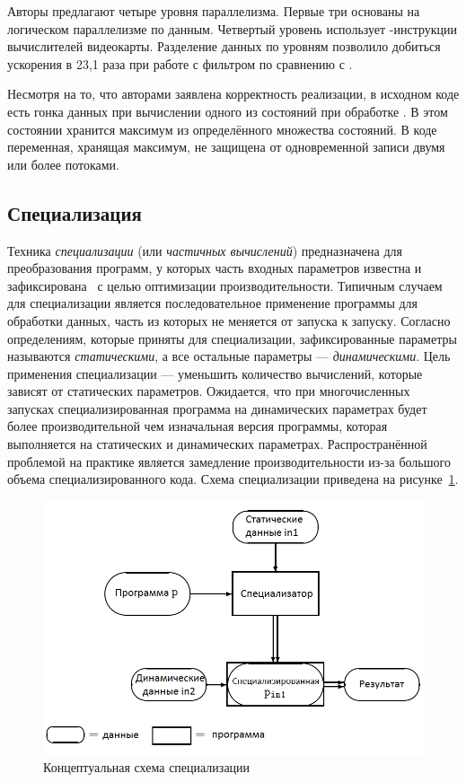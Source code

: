 Авторы предлагают четыре уровня параллелизма.
Первые три основаны на логическом параллелизме по данным.
Четвертый уровень использует -инструкции 
вычислителей видеокарты.
Разделение данных по уровням позволило добиться ускорения в 
23,1 раза при работе с фильтром  по сравнению с
.

Несмотря на то, что авторами заявлена корректность 
реализации, в исходном коде есть гонка данных при вычислении 
одного из состояний при обработке .
В этом состоянии хранится максимум из определённого множества состояний.
В коде  переменная, хранящая максимум, 
не защищена от одновременной записи двумя или более потоками.

\subsection{Специализация}
Техника \emph{специализации} (или \emph{частичных вычислений}) предназначена для
преобразования программ, у которых часть входных параметров
известна и зафиксирована~\cite{Jones_spec} с целью оптимизации производительности.
Типичным случаем для специализации является последовательное 
применение программы для обработки данных, часть из которых 
не меняется от запуска к запуску.
Согласно определениям, которые приняты для специализации, 
зафиксированные параметры называются \emph{статическими}, а 
все остальные параметры --- \emph{динамическими}.
Цель применения специализации --- уменьшить количество 
вычислений, которые зависят от статических параметров.
Ожидается, что при многочисленных запусках специализированная 
программа на динамических параметрах будет более 
производительной чем изначальная версия программы, которая 
выполняется на статических и динамических параметрах.
Распространённой проблемой на практике является замедление 
производительности из-за большого объема специализированного
кода.
Схема специализации приведена на рисунке~\ref{spec}.
\begin{figure}[h!]
  \centering
  \includegraphics[width=\columnwidth]{spec.png}
  \caption{Концептуальная схема специализации\protect\footnotemark}
  \label{spec}
\end{figure}

